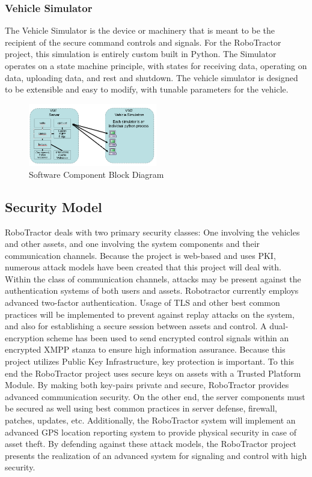 \documentclass[conference,12pt]{IEEEtran}
\begin{document}
\subsubsection{Vehicle Simulator}
The Vehicle Simulator is the device or machinery that is meant to be the recipient of the secure command controls and signals. For the RoboTractor project, this simulation is entirely custom built in Python. The Simulator operates on a state machine principle, with states for receiving data, operating on data, uploading data, and rest and shutdown. The vehicle simulator is designed to be extensible and easy to modify, with tunable parameters for the vehicle.

\begin{figure}
\centering
\includegraphics[width=0.5\textwidth, scale=0.5]{Images/SoftwareComponentBlockDiagram.png}
\caption{Software Component Block Diagram}
\label{fig:softwarecomponents}
\end{figure}

\subsection{Security Model}
RoboTractor deals with two primary security classes: One involving the vehicles
and other assets, and one involving the system components and their communication channels.
Because the project is web-based and uses PKI, numerous attack models have been created that this project will deal with. Within the class of communication channels, attacks may be present against the authentication systems of both users and assets. Robotractor currently employs advanced two-factor authentication. Usage of TLS and other best common practices will be implemented to prevent against replay attacks on the system, and also for establishing a secure session between assets and control. A dual-encryption scheme has been used to send encrypted control signals within an encrypted XMPP stanza to ensure high information assurance. Because this project utilizes Public Key Infrastructure, key protection is important.  To this end the RoboTractor project uses secure keys on assets with a Trusted Platform Module. By making both key-pairs private and secure, RoboTractor provides advanced communication security. On the other end, the server components must be secured as well using best common practices in server defense, firewall, patches, updates, etc. Additionally, the RoboTractor system will implement an advanced GPS location reporting system to provide physical security in case of asset theft. By defending against these attack models, the RoboTractor project presents the realization of an advanced system for signaling and control with high security.
\end{document}
